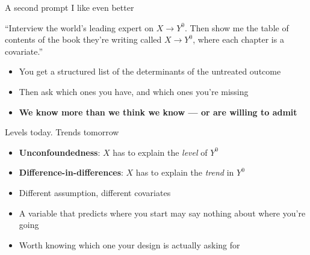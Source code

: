 \documentclass{beamer}
\newcommand{\highlight}[1]{\textcolor{accent}{\textbf{#1}}}
\begin{document}
\begin{frame}{A second prompt I like even better}

\begin{block}{}
\small
``Interview the world's leading expert on $X \rightarrow Y^0$. Then show me the
table of contents of the book they're writing called $X \rightarrow Y^0$, where
each chapter is a covariate.''
\end{block}

\vspace{0.7em}

\begin{itemize}
\item You get a structured list of the determinants of the untreated outcome
\item Then ask which ones you have, and which ones you're missing
\item \highlight{We know more than we think we know --- or are willing to admit}
\end{itemize}

\end{frame}


\begin{frame}{Levels today. Trends tomorrow}

\begin{itemize}
\item \textbf{Unconfoundedness}: $X$ has to explain the \emph{level} of $Y^0$
\item \textbf{Difference-in-differences}: $X$ has to explain the \emph{trend} in $Y^0$
\end{itemize}

\vspace{0.8em}

\begin{itemize}
\item Different assumption, different covariates
\item A variable that predicts where you start may say nothing about where you're going
\item Worth knowing which one your design is actually asking for
\end{itemize}

\end{frame}
\end{document}
